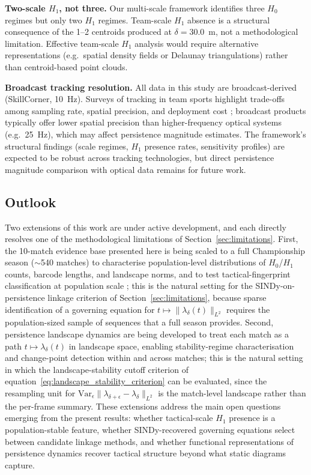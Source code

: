 \textbf{Two-scale \(H_1\), not three.} Our multi-scale framework identifies three \(H_0\) regimes but only two \(H_1\) regimes. Team-scale \(H_1\) absence is a structural consequence of the 1--2 centroids produced at \(\delta=30.0\)~m, not a methodological limitation. Effective team-scale \(H_1\) analysis would require alternative representations (e.g.\ spatial density fields or Delaunay triangulations) rather than centroid-based point clouds.

\textbf{Broadcast tracking resolution.} All data in this study are broadcast-derived (SkillCorner, 10~Hz). Surveys of tracking in team sports highlight trade-offs among sampling rate, spatial precision, and deployment cost \citep{Cummins2013, Aughey2011}; broadcast products typically offer lower spatial precision than higher-frequency optical systems (e.g.\ 25~Hz), which may affect persistence magnitude estimates. The framework's structural findings (scale regimes, $H_1$ presence rates, sensitivity profiles) are expected to be robust across tracking technologies, but direct persistence magnitude comparison with optical data remains for future work.

\subsection{Outlook}
\label{sec:outlook}

Two extensions of this work are under active development, and each directly resolves one of the methodological limitations of Section~\ref{sec:limitations}. First, the 10-match evidence base presented here is being scaled to a full Championship season ($\sim$540 matches) to characterise population-level distributions of $H_0$/$H_1$ counts, barcode lengths, and landscape norms, and to test tactical-fingerprint classification at population scale \citep{Brown2026inprep}; this is the natural setting for the SINDy-on-persistence linkage criterion of Section~\ref{sec:limitations}, because sparse identification of a governing equation for $t\mapsto\|\lambda_\delta(t)\|_{L^2}$ requires the population-sized sample of sequences that a full season provides. Second, persistence landscape dynamics \citep{Bubenik2015,Chazal2014} are being developed to treat each match as a path $t \mapsto \lambda_\delta(t)$ in landscape space, enabling stability-regime characterisation and change-point detection within and across matches; this is the natural setting in which the landscape-stability cutoff criterion of equation~\eqref{eq:landscape_stability_criterion} can be evaluated, since the resampling unit for $\mathrm{Var}_\epsilon\|\lambda_{\delta+\epsilon}-\lambda_\delta\|_{L^2}$ is the match-level landscape rather than the per-frame summary. These extensions address the main open questions emerging from the present results: whether tactical-scale $H_1$ presence is a population-stable feature, whether SINDy-recovered governing equations select between candidate linkage methods, and whether functional representations of persistence dynamics recover tactical structure beyond what static diagrams capture.
